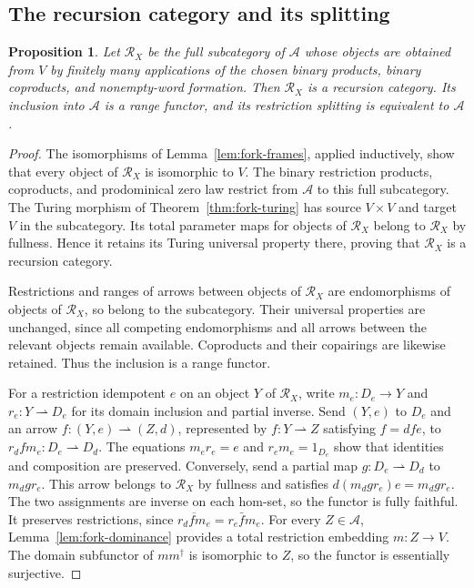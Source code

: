 \documentclass[11pt]{article}
\newtheorem{proposition}[theorem]{Proposition}
\begin{document}
\subsection{The recursion category and its splitting}

\begin{proposition}\label{prop:fork-recursion}
Let $\mathscr R_X$ be the full subcategory of $\mathcal A$
whose objects are obtained from $V$ by finitely many applications
of the chosen binary products, binary coproducts, and nonempty-word formation.
Then $\mathscr R_X$ is a recursion category. Its inclusion
into $\mathcal A$ is a range functor, and its restriction
splitting is equivalent to $\mathcal A$.
\end{proposition}
\begin{proof}
The isomorphisms of Lemma~\ref{lem:fork-frames}, applied inductively,
show that every object of $\mathscr R_X$ is isomorphic to $V$.
The binary restriction products, coproducts, and prodominical
zero law restrict from $\mathcal A$ to this full subcategory.
The Turing morphism of Theorem~\ref{thm:fork-turing} has
source $V\times V$ and target $V$ in the subcategory.
Its total parameter maps for objects of $\mathscr R_X$ belong
to $\mathscr R_X$ by fullness. Hence it retains its Turing
universal property there, proving that $\mathscr R_X$ is a
recursion category.

Restrictions and ranges of arrows between objects of $\mathscr R_X$
are endomorphisms of objects of $\mathscr R_X$, so belong to the subcategory.
Their universal properties are unchanged, since all competing
endomorphisms and all arrows between the relevant objects remain
available. Coproducts and their copairings are likewise retained.
Thus the inclusion is a range functor.

For a restriction idempotent $e$ on an object $Y$ of $\mathscr R_X$,
write $m_e:D_e\to Y$ and $r_e:Y\rightharpoonup D_e$ for its
domain inclusion and partial inverse. Send $(Y,e)$ to $D_e$
and an arrow $f:(Y,e)\rightharpoonup(Z,d)$, represented by
$f:Y\rightharpoonup Z$ satisfying $f=dfe$, to
$r_d f m_e:D_e\rightharpoonup D_d$.
The equations $m_er_e=e$ and $r_em_e=1_{D_e}$ show that
identities and composition are preserved. Conversely, send a
partial map $g:D_e\rightharpoonup D_d$ to $m_d g r_e$.
This arrow belongs to $\mathscr R_X$ by fullness and satisfies
$d(m_d g r_e)e=m_d g r_e$. The two assignments are inverse on
each hom-set, so the functor is fully faithful.
It preserves restrictions, since
$\overline{r_d f m_e}=r_e\bar f m_e$.
For every $Z\in\mathcal A$, Lemma~\ref{lem:fork-dominance}
provides a total restriction embedding $m:Z\to V$.
The domain subfunctor of $mm^\dagger$ is isomorphic to $Z$,
so the functor is essentially surjective.
\end{proof}
\end{document}
